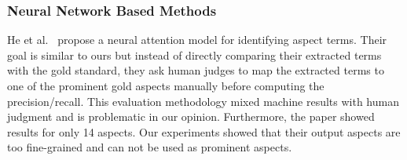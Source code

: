 \subsubsection{Neural Network Based Methods}
He et al.~  propose a neural attention model 
for identifying aspect terms. Their goal is similar to ours but instead of
directly comparing their extracted terms with the gold standard, they ask
human judges to map the extracted terms to one of the prominent gold 
aspects manually before computing the precision/recall. This evaluation 
methodology mixed machine results with human judgment and is problematic
in our opinion. Furthermore, the paper showed results for only 14 aspects.
Our experiments showed that their output aspects are too fine-grained and 
can not be used as prominent aspects.
%

